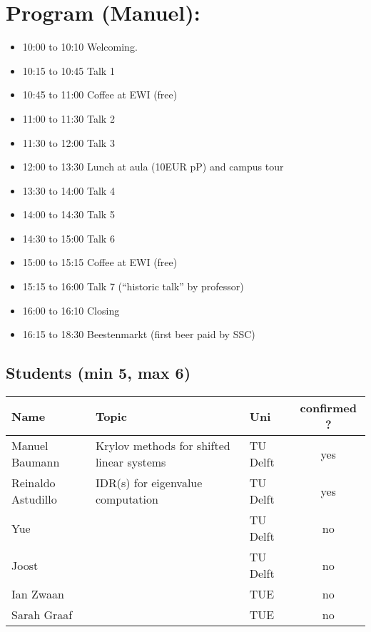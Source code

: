 \documentclass{article}
\begin{document}
\section{Program (Manuel):}
\begin{itemize}
\item 10:00 to 10:10 Welcoming. 
\item 10:15 to 10:45 Talk 1
\item 10:45 to 11:00 Coffee at EWI (free)
\item 11:00 to 11:30 Talk 2
\item 11:30 to 12:00 Talk 3
\item 12:00 to 13:30 Lunch at aula (10EUR pP) and campus tour
\item 13:30 to 14:00 Talk 4
\item 14:00 to 14:30 Talk 5
\item 14:30 to 15:00 Talk 6
\item 15:00 to 15:15 Coffee at EWI (free) 
\item 15:15 to 16:00 Talk 7 (``historic talk'' by professor)  
\item 16:00 to 16:10 Closing
\item 16:15 to 18:30 Beestenmarkt (first beer paid by SSC) 
\end{itemize}
\subsection{Students (min 5, max 6)}
\begin{table}[h]
 \centering
 \begin{tabular}{|l|l|l|c|}
 \hline
 \textbf{Name} & \textbf{Topic} & \textbf{Uni} & \textbf{confirmed ?}\\
 \hline
 Manuel Baumann & Krylov methods for shifted linear systems & TU Delft & yes\\
 Reinaldo Astudillo & IDR(s) for eigenvalue computation & TU Delft & yes \\
 Yue & & TU Delft & no \\
 Joost & & TU Delft & no \\
 Ian Zwaan & & TUE & no \\
 Sarah Graaf & & TUE & no \\

 \hline
 \end{tabular}

\end{table}
\end{document}
